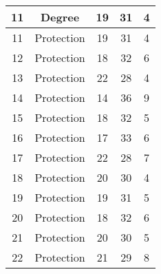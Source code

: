 \documentclass[results.tex]{subfiles}
\begin{document}
\begin{center}
\begin{tabular}{| c || c | c | c | c |}
            \hline
            11                      & Degree                       & 19                     & 31                      & 4                    \\
            \hline
            11                      & Protection                   & 19                     & 31                      & 4                    \\
            \hline
            12                      & Protection                   & 18                     & 32                      & 6                    \\
            \hline
            13                      & Protection                   & 22                     & 28                      & 4                    \\
            \hline
            14                      & Protection                   & 14                     & 36                      & 9                    \\
            \hline
            15                      & Protection                   & 18                     & 32                      & 5                    \\
            \hline
            16                      & Protection                   & 17                     & 33                      & 6                    \\
            \hline
            17                      & Protection                   & 22                     & 28                      & 7                    \\
            \hline
            18                      & Protection                   & 20                     & 30                      & 4                    \\
            \hline
            19                      & Protection                   & 19                     & 31                      & 5                    \\
            \hline
            20                      & Protection                   & 18                     & 32                      & 6                    \\
            \hline
            21                      & Protection                   & 20                     & 30                      & 5                    \\
            \hline
            22                      & Protection                   & 21                     & 29                      & 8                    \\

\end{tabular}
\end{center}
\end{document}
